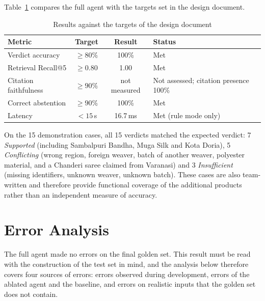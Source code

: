 Table~\ref{tab:targets} compares the full agent with the targets set in the design document.

\begin{table}[H]
\centering
\caption{Results against the targets of the design document}
\label{tab:targets}
\small
\begin{tabularx}{\linewidth}{@{}>{\raggedright\arraybackslash}X c c >{\raggedright\arraybackslash}p{3.6cm}@{}}
\toprule
\textbf{Metric} & \textbf{Target} & \textbf{Result} & \textbf{Status} \\ \midrule
Verdict accuracy & $\geq 80\%$ & 100\% & Met \\
Retrieval Recall@5 & $\geq 0.80$ & 1.00 & Met \\
Citation faithfulness & $\geq 90\%$ & not measured & Not assessed; citation presence 100\% \\
Correct abstention & $\geq 90\%$ & 100\% & Met \\
Latency & $< 15$\,s & 16.7\,ms & Met (rule mode only) \\
\bottomrule
\end{tabularx}
\end{table}

On the 15 demonstration cases, all 15 verdicts matched the expected verdict: 7 \emph{Supported} (including
Sambalpuri Bandha, Muga Silk and Kota Doria), 5 \emph{Conflicting} (wrong region, foreign weaver, batch
of another weaver, polyester material, and a Chanderi saree claimed from Varanasi) and 3
\emph{Insufficient} (missing identifiers, unknown weaver, unknown batch). These cases are also
team-written and therefore provide functional coverage of the additional products rather than an
independent measure of accuracy.

\section{Error Analysis}

The full agent made no errors on the final golden set. This result must be read with the construction of
the test set in mind, and the analysis below therefore covers four sources of errors: errors observed
during development, errors of the ablated agent and the baseline, and errors on realistic inputs that
the golden set does not contain.

